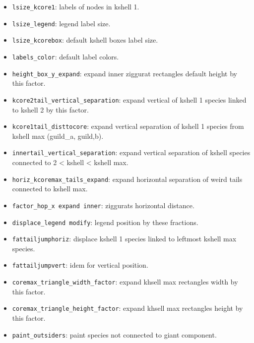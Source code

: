\documentclass[12pt]{article}
\begin{document}
\begin{itemize}
\item \texttt{lsize\_kcore1}: labels of nodes in kshell 1.

\item \texttt{lsize\_legend}: legend label size.

\item \texttt{lsize\_kcorebox}: default kshell boxes label size.

\item \texttt{labels\_color}: default label colors.

\item \texttt{height\_box\_y\_expand}: expand inner ziggurat rectangles default height by this factor.

\item \texttt{kcore2tail\_vertical\_separation}: expand vertical of kshell 1 species linked to kshell 2 by this factor.

\item \texttt{kcore1tail\_disttocore}: expand vertical separation of kshell 1 species from kshell max (guild\_a, guild,b).

\item \texttt{innertail\_vertical\_separation}: expand vertical separation of kshell species connected to 2 < kshell < kshell max.

\item \texttt{horiz\_kcoremax\_tails\_expand}: expand horizontal separation of weird tails connected to kshell max.

\item \texttt{factor\_hop\_x expand inner}: ziggurats horizontal distance.

\item \texttt{displace\_legend modify}: legend position by these fractions.

\item \texttt{fattailjumphoriz}: displace kshell 1 species linked to leftmost kshell max species.

\item \texttt{fattailjumpvert}: idem for vertical position.

\item \texttt{coremax\_triangle\_width\_factor}: expand khsell max rectangles width by this factor.

\item \texttt{coremax\_triangle\_height\_factor}: expand khsell max rectangles height by this factor.

\item \texttt{paint\_outsiders}: paint species not connected to giant component.


\end{itemize}
\end{document}
